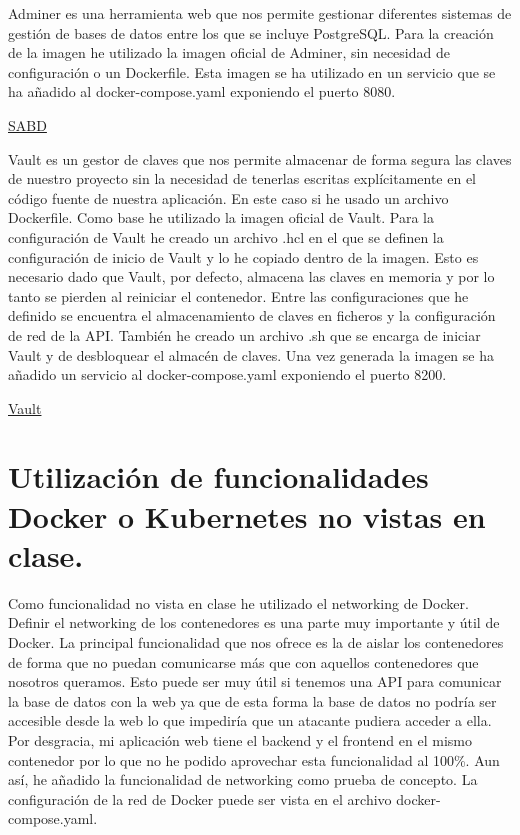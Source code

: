 \documentclass{report}
\begin{document}
            Adminer es una herramienta web que nos permite gestionar diferentes sistemas de gestión de bases de datos entre los que se incluye PostgreSQL.
            Para la creación de la imagen he utilizado la imagen oficial de Adminer, sin necesidad de configuración o un Dockerfile.
            Esta imagen se ha utilizado en un servicio que se ha añadido al docker-compose.yaml exponiendo el puerto 8080.
            \begin{center}
                \textcolor{Cyan}{\href{https://hub.docker.com/repository/docker/xabierland/sabd/general}{SABD}}
            \end{center}
            Vault es un gestor de claves que nos permite almacenar de forma segura las claves de nuestro proyecto sin la necesidad de tenerlas escritas explícitamente en el código fuente de nuestra aplicación.
            En este caso si he usado un archivo Dockerfile.
            Como base he utilizado la imagen oficial de Vault.
            Para la configuración de Vault he creado un archivo .hcl en el que se definen la configuración de inicio de Vault y lo he copiado dentro de la imagen. 
            Esto es necesario dado que Vault, por defecto, almacena las claves en memoria y por lo tanto se pierden al reiniciar el contenedor.
            Entre las configuraciones que he definido se encuentra el almacenamiento de claves en ficheros y la configuración de red de la API.
            También he creado un archivo .sh que se encarga de iniciar Vault y de desbloquear el almacén de claves.
            Una vez generada la imagen se ha añadido un servicio al docker-compose.yaml exponiendo el puerto 8200.
            \begin{center}
                \textcolor{Cyan}{\href{https://hub.docker.com/repository/docker/xabierland/vault/general}{Vault}}
            \end{center}
        \clearpage
        \section{Utilización de funcionalidades Docker o Kubernetes no vistas en clase.}
            Como funcionalidad no vista en clase he utilizado el networking de Docker.
            Definir el networking de los contenedores es una parte muy importante y útil de Docker.
            La principal funcionalidad que nos ofrece es la de aislar los contenedores de forma que no puedan comunicarse más que con aquellos contenedores que nosotros queramos.
            Esto puede ser muy útil si tenemos una API para comunicar la base de datos con la web ya que de esta forma la base de datos no podría ser accesible desde la web lo que impediría que un atacante pudiera acceder a ella.
            Por desgracia, mi aplicación web tiene el backend y el frontend en el mismo contenedor por lo que no he podido aprovechar esta funcionalidad al 100\%.
            Aun así, he añadido la funcionalidad de networking como prueba de concepto.
            La configuración de la red de Docker puede ser vista en el archivo docker-compose.yaml.\\
\end{document}
